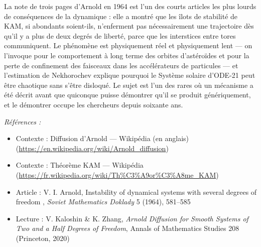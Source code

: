 \documentclass[11pt]{article}
\newenvironment{refs}{\par\small\noindent\emph{Références :}\begin{itemize}\setlength\itemsep{0pt}}{\end{itemize}\normalsize}
\begin{document}
\noindent La note de trois pages d'Arnold en 1964 est l'un des courts articles les plus
lourds de conséquences de la dynamique : elle a montré que les îlots de stabilité de KAM, si
abondants soient-ils, n'enferment pas nécessairement une trajectoire dès qu'il y a plus de deux
degrés de liberté, parce que les interstices entre tores communiquent. Le phénomène est
physiquement réel et physiquement lent --- on l'invoque pour le comportement à long terme des
orbites d'astéroïdes et pour la perte de confinement des faisceaux dans les accélérateurs de
particules --- et l'estimation de Nekhorochev explique pourquoi le Système solaire d'ODE-21 peut
être chaotique sans s'être disloqué. Le sujet est l'un des rares où un mécanisme a été décrit
avant que quiconque puisse démontrer qu'il se produit génériquement, et le démontrer occupe les
chercheurs depuis soixante ans.

\begin{refs}
\item Contexte : Diffusion d'Arnold --- Wikipédia (en anglais) (\url{https://en.wikipedia.org/wiki/Arnold_diffusion})
\item Contexte : Théorème KAM --- Wikipédia (\url{https://fr.wikipedia.org/wiki/Th%C3%A9or%C3%A8me_KAM})
\item Article : V. I. Arnold, \og{} Instability of dynamical systems with several degrees of freedom \fg{}, \textit{Soviet Mathematics Doklady} 5 (1964), 581--585
\item Lecture : V. Kaloshin \& K. Zhang, \textit{Arnold Diffusion for Smooth Systems of Two and a Half Degrees of Freedom}, Annals of Mathematics Studies 208 (Princeton, 2020)
\end{refs}

\bigskip
\end{document}
